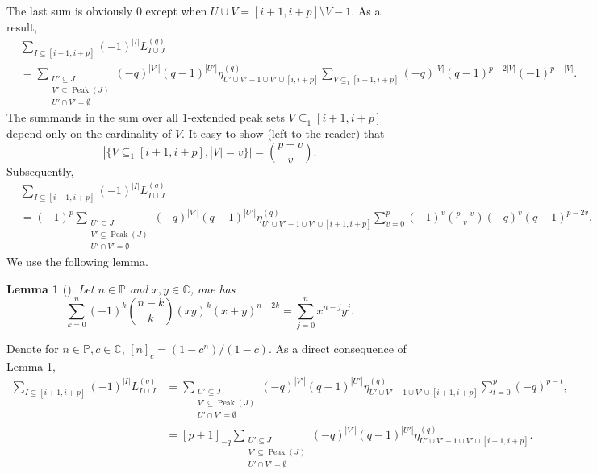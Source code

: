 \documentclass[submission]{FPSAC2023}
\newtheorem{lem}{Lemma}
\newcommand{\CC}{\mathbb{C}} %
\newcommand{\PP}{\mathbb{P}} %
\newcommand{\Peak}{\operatorname{Peak}}
\begin{document}
The last sum is obviously $0$ except when $U \cup V = [i+1, i+p] \setminus V-1$. As a result, 
\begin{align*}
&\sum_{I \subseteq [i+1, i+p]}(-1)^{|I|}L^{(q)}_{I \cup J} \\
&=  \sum_{\substack{U' \subseteq J\\ V' \subseteq \Peak(J) \\ U'\cap V' = \emptyset}}\!\!\!\!\!\!\!(-q)^{|V'|}(q-1)^{|U'|} \eta^{(q)}_{U' \cup V'-1 \cup V' \cup [i,i+p]}\sum_{V \subseteq_1 [i+1, i+p]}\!\!\!\!\!\!\!\!(-q)^{|V|}(q-1)^{p - 2|V|}(-1)^{p - |V|}.
\end{align*}
The summands in the sum over all $1$-extended peak sets $V \subseteq_1 [i+1, i+p]$ depend only on the cardinality of $V$. It easy to show (left to the reader) that
\begin{equation*}
|\{V\subseteq_1 [i+1, i+p], |V| = v\}| = \binom{p - v}{v}.
\end{equation*}
Subsequently,
\begin{align*}
&\sum_{I \subseteq [i+1, i+p]}(-1)^{|I|}L^{(q)}_{I \cup J} \\
&= (-1)^{p}\!\!\!\!\!\!\!\!\! \sum_{\substack{U' \subseteq J\\ V' \subseteq \Peak(J) \\ U'\cap V' = \emptyset}}\!\!\!\!\!\!\!(-q)^{|V'|}(q-1)^{|U'|} \eta^{(q)}_{U' \cup V'-1 \cup V' \cup [i+1,i+p]}\sum_{v = 0}^p(-1)^v\binom{p-v}{v}(-q)^{v}(q-1)^{p - 2v}.
\end{align*}
We use the following lemma.
%
\begin{lem}[\cite{Sur04}]
\label{lem.binom}
Let $n \in \PP$ and $x,y \in \CC$, one has
\begin{equation*}
\sum_{k = 0}^n(-1)^k\binom{n-k}{k}(xy)^k(x+y)^{n-2k} = \sum_{j=0}^n x^{n-j}y^j.
\end{equation*}
\end{lem}
%
\noindent Denote for $n \in \PP, c \in \CC$, $[n]_c = (1-c^n)/(1-c)$. As a direct consequence of Lemma \ref{lem.binom},
\begin{align*}
\sum_{I \subseteq [i+1, i+p]}(-1)^{|I|}L^{(q)}_{I \cup J} &=  \sum_{\substack{U' \subseteq J\\ V' \subseteq \Peak(J) \\ U'\cap V' = \emptyset}}\!\!\!\!\!\!\!(-q)^{|V'|}(q-1)^{|U'|} \eta^{(q)}_{U' \cup V'-1 \cup V' \cup [i+1,i+p]}\sum_{t= 0}^{p}(-q)^{p-t},\\
&=[p+1]_{-q}\sum_{\substack{U' \subseteq J\\ V' \subseteq \Peak(J) \\ U'\cap V' = \emptyset}}\!\!\!\!\!\!\!(-q)^{|V'|}(q-1)^{|U'|} \eta^{(q)}_{U' \cup V'-1 \cup V' \cup [i+1,i+p]}.
\end{align*}
\end{document}
